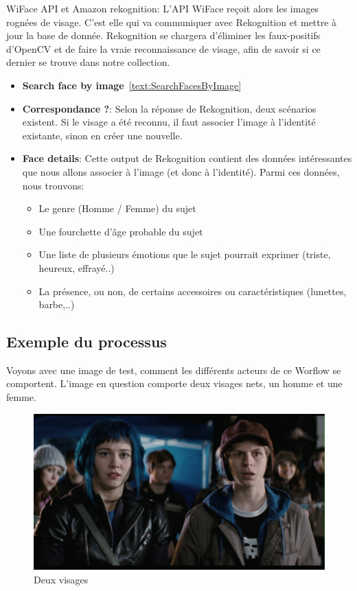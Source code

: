 WiFace API et Amazon rekognition:
L'API WiFace reçoit alors les images rognées de visage. 
C'est elle qui va communiquer avec Rekognition et mettre à jour la base de donnée.
Rekognition se chargera d'éliminer les faux-positifs d'OpenCV et de faire la vraie reconnaissance de visage,
afin de savoir si ce dernier se trouve dans notre collection.
\begin{itemize}
    \item \textbf{Search face by image}~\ref{text:SearchFacesByImage}
    \item \textbf{Correspondance ?}: Selon la réponse de Rekognition, deux scénarios existent. Si le visage a été reconnu, il faut associer l'image à l'identité existante, sinon en créer une nouvelle.
    \item \textbf{Face details}: Cette output de Rekognition contient des données intéressantes que nous allons associer à l'image (et donc à l'identité). Parmi ces données, nous trouvons:
    \begin{itemize}
        \item Le genre (Homme / Femme) du sujet
        \item Une fourchette d'âge probable du sujet
        \item Une liste de plusieurs émotions que le sujet pourrait exprimer (triste, heureux, effrayé..)
        \item La présence, ou non, de certains accessoires ou caractéristiques (lunettes, barbe,..)
    \end{itemize} 
\end{itemize} 

\subsection{Exemple du processus}
Voyons avec une image de test, comment les différents acteurs de ce Worflow se comportent.
L'image en question comporte deux visages nets, un homme et une femme.

\begin{figure}[H]
	\centering
	\includegraphics[width=12cm]{images/facial_reco/scott.jpg}
    \caption{Deux visages}
	\label{fig:scott}
\end{figure}

